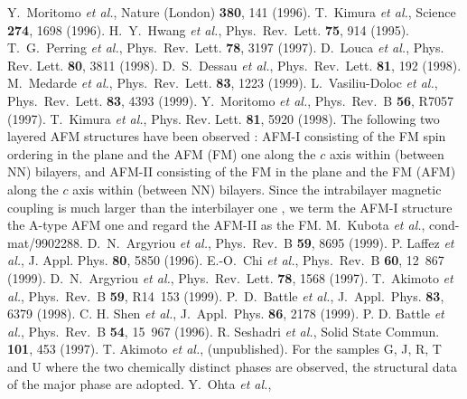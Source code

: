 \begin{references}
%
Y.~Moritomo {\it et al.}, 
Nature (London) {\bf 380}, 141 (1996). 
%
T.~Kimura {\it et al.},
Science {\bf 274}, 1698 (1996). 
%
H.~Y.~Hwang {\it et al.}, 
Phys.\ Rev.\ Lett. {\bf 75}, 914 (1995).  
%
T.~G.~Perring {\it et al.}, 
Phys.~Rev.~Lett. {\bf 78}, 3197 (1997). 
%
D.~Louca {\it et al.}, 
Phys. Rev. Lett. {\bf 80}, 3811 (1998). 
D.~S.~Dessau {\it et al.}, 
Phys.~Rev.~Lett. {\bf 81}, 192 (1998). 
%
M.~Medarde {\it et al.},  
Phys.\ Rev.\ Lett. {\bf 83}, 1223 (1999). 
%
L.~Vasiliu-Doloc {\it et al.},  
Phys.\ Rev.\ Lett. {\bf 83}, 4393 (1999). 
%
Y.~Moritomo {\it et al.},
Phys.~Rev.~B {\bf 56}, R7057 (1997). 
%
T.~Kimura {\it et al.}, 
Phys. Rev. Lett. {\bf 81}, 5920 (1998).
%
The following two layered AFM structures have been observed \protect\cite{kubota,argyriou99}: 
AFM-I consisting of the FM spin ordering in the plane and the AFM (FM) one along the $c$ axis 
within (between NN) bilayers, 
and 
AFM-II consisting of the FM in the plane and the FM (AFM) along the $c$ axis within (between NN) bilayers. 
%
Since the intrabilayer magnetic coupling is much larger than the interbilayer one \cite{fujioka}, 
we term the AFM-I structure the A-type AFM one and 
regard the AFM-II  as the FM.
%
%
M.~Kubota {\it et al.}, 
cond-mat/9902288. 
%
D.~N.~Argyriou {\it et al.},  
Phys.~Rev.~B {\bf 59}, 8695 (1999). 
%
P. Laffez {\it et al.},  
J. Appl. Phys. {\bf 80}, 5850 (1996). 
%
E.-O.~Chi {\it et al.},  
Phys.~Rev.~B {\bf 60}, 12~867 (1999). 
%
D.~N.~Argyriou {\it et al.}, 
Phys.\ Rev.\ Lett. {\bf 78}, 1568 (1997). 
%
T.~Akimoto {\it et al.}, 
Phys.\ Rev.\ B {\bf 59}, R14~153 (1999). 
%
P.~D.~Battle {\it et al.}, 
J.~Appl.~Phys. {\bf 83}, 6379 (1998). 
%
C. H. Shen {\it et al.}, 
J.~Appl.~Phys. {\bf 86}, 2178 (1999). 
%
P. D. Battle  {\it et al.}, 
Phys.\ Rev.\ B {\bf 54}, 15~967 (1996). 
%
R. Seshadri {\it et al.},  
Solid State Commun. {\bf 101}, 453 (1997). 
%
T. Akimoto {\it et al.}, 
(unpublished). 
%
For the samples G, J, R, T and U 
where the two chemically distinct phases are observed, 
the structural data of the major phase are adopted.  
%
%
%
Y.~Ohta {\it et al.},  

\end{references}
